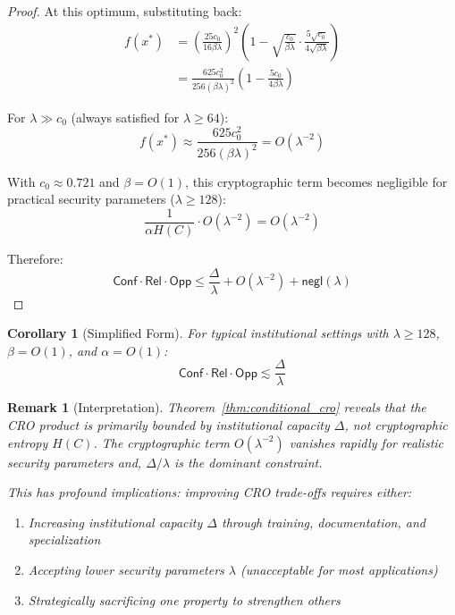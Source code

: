 \documentclass{ieeeaccess}
\newcommand{\Conf}{\mathsf{Conf}}
\newcommand{\Rel}{\mathsf{Rel}}
\newcommand{\Opp}{\mathsf{Opp}}
\newcommand{\negl}{\mathsf{negl}}
\newtheorem{corollary}{Corollary}[subsection]
\newtheorem{remark}{Remark}[subsection]
\begin{document}
\begin{proof}
At this optimum, substituting back:
\begin{align}
f(x^*) &= \left(\frac{25c_0}{16\beta\lambda}\right)^2 \left(1 - \sqrt{\frac{c_0}{\beta\lambda}} \cdot \frac{5\sqrt{c_0}}{4\sqrt{\beta\lambda}}\right) \\
       &= \frac{625c_0^2}{256(\beta\lambda)^2} \left(1 - \frac{5c_0}{4\beta\lambda}\right)
\end{align}

For $\lambda \gg c_0$ (always satisfied for $\lambda \geq 64$):
\begin{equation}
f(x^*) \approx \frac{625c_0^2}{256(\beta\lambda)^2} = O(\lambda^{-2})
\end{equation}

With $c_0 \approx 0.721$ and $\beta = O(1)$, this cryptographic term becomes negligible for practical security parameters ($\lambda \geq 128$):
\begin{equation}
\frac{1}{\alpha H(C)} \cdot O(\lambda^{-2}) = O(\lambda^{-2})
\end{equation}

Therefore:
\begin{equation}
\Conf \cdot \Rel \cdot \Opp \leq \frac{\Delta}{\lambda} + O(\lambda^{-2}) + \negl(\lambda)
\end{equation}
\end{proof}
\begin{corollary}[Simplified Form]\label{cor:simplified}
For typical institutional settings with $\lambda \geq 128$, $\beta = O(1)$, and $\alpha = O(1)$:
\begin{equation}
\Conf \cdot \Rel \cdot \Opp \lesssim \frac{\Delta}{\lambda}
\end{equation}
\end{corollary}

\begin{remark}[Interpretation]\label{rem:interpretation}
Theorem~\ref{thm:conditional_cro} reveals that the CRO product is primarily bounded by \emph{institutional capacity} $\Delta$, not cryptographic entropy $H(C)$. The cryptographic term $O(\lambda^{-2})$ vanishes rapidly for realistic security parameters and, $\Delta/\lambda$ is the dominant constraint.

This has profound implications: improving CRO trade-offs requires either:
\begin{enumerate}
\item Increasing institutional capacity $\Delta$ through training, documentation, and specialization
\item Accepting lower security parameters $\lambda$ (unacceptable for most applications)
\item Strategically sacrificing one property to strengthen others
\end{enumerate}
\end{remark}
\end{document}
